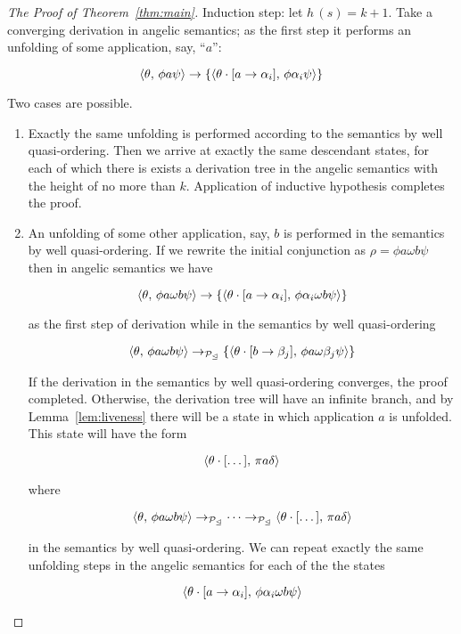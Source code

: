 \begin{proof}[The Proof of Theorem~\ref{thm:main}]
  Induction step: let $h\,(s)=k+1$. Take a converging derivation in angelic semantics; as the first step it performs an unfolding of
  some application, say, ``$a$'':

  \[
  \langle \theta,\,\phi a \psi \rangle \to \{\langle \theta\cdot[a\to\alpha_i],\,\phi\alpha_i\psi \rangle\}
  \]

  Two cases are possible.

  \begin{enumerate}
    
  \item Exactly the same unfolding is performed according to the semantics by well quasi-ordering. Then we arrive at
    exactly the same descendant states, for each of which there is exists a derivation tree in the angelic semantics
    with the height of no more than $k$. Application of inductive hypothesis completes the proof.
    
  \item An unfolding of some other application, say, $b$ is performed in the semantics by well quasi-ordering. If we
    rewrite the initial conjunction as $\rho=\phi a \omega b \psi$ then in angelic semantics we have

    \[
    \langle \theta,\,\phi a \omega b\psi \rangle\to\{\langle \theta\cdot[a\to\alpha_i],\,\phi \alpha_i \omega b\psi \rangle\}
    \]

    as the first step of derivation while in the semantics by well quasi-ordering

    \[
    \langle \theta,\,\phi a \omega b\psi \rangle\to_{\mathcal{P}_\trianglelefteq}\{\langle \theta\cdot[b\to\beta_j],\,\phi a \omega \beta_j\psi \rangle\}
    \]

    If the derivation in the semantics by well quasi-ordering converges, the proof completed. Otherwise, the derivation
    tree will have an infinite branch, and by Lemma~\ref{lem:liveness} there will be a state in which
    application $a$ is unfolded. This state will have the form

    \[
    \langle \theta\cdot[\dots],\,\pi a \delta \rangle
    \]

    where 

    \[
    \langle \theta,\,\phi a \omega b\psi \rangle\to_{\mathcal{P}_\trianglelefteq}\dots\to_{\mathcal{P}_\trianglelefteq}\langle \theta\cdot[\dots],\,\pi a \delta \rangle
    \]

    in the semantics by well quasi-ordering. We can repeat exactly the same unfolding steps in the
    angelic semantics for each of the the states

    \[
    \langle \theta\cdot[a\to\alpha_i],\,\phi \alpha_i \omega b\psi \rangle
    \]


\end{enumerate}
\end{proof}
